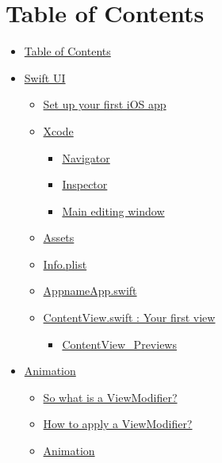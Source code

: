 \documentclass[]{article}
\date{}
\providecommand{\tightlist}{%
  \setlength{\itemsep}{0pt}\setlength{\parskip}{0pt}}
\begin{document}
\hypertarget{table-of-contents}{%
\section{Table of Contents}\label{table-of-contents}}

\begin{itemize}
\tightlist
\item
  \protect\hyperlink{table-of-contents}{Table of Contents}
\item
  \protect\hyperlink{swift-ui}{Swift UI}

  \begin{itemize}
  \tightlist
  \item
    \protect\hyperlink{set-up-your-first-ios-app}{Set up your first iOS
    app}
  \item
    \protect\hyperlink{xcode}{Xcode}

    \begin{itemize}
    \tightlist
    \item
      \protect\hyperlink{navigator}{Navigator}
    \item
      \protect\hyperlink{inspector}{Inspector}
    \item
      \protect\hyperlink{main-editing-window}{Main editing window}
    \end{itemize}
  \item
    \protect\hyperlink{assets}{Assets}
  \item
    \protect\hyperlink{infoplist}{Info.plist}
  \item
    \protect\hyperlink{appnameappswift}{AppnameApp.swift}
  \item
    \protect\hyperlink{contentviewswift--your-first-view}{ContentView.swift
    : Your first view}

    \begin{itemize}
    \tightlist
    \item
      \protect\hyperlink{contentview_previews}{ContentView\_Previews}
    \end{itemize}
  \end{itemize}
\item
  \protect\hyperlink{animation}{Animation}

  \begin{itemize}
  \tightlist
  \item
    \protect\hyperlink{so-what-is-a-viewmodifier}{So what is a
    ViewModifier?}
  \item
    \protect\hyperlink{how-to-apply-a-viewmodifier}{How to apply a
    ViewModifier?}
  \item
    \protect\hyperlink{animation-1}{Animation}


\end{itemize}
\end{itemize}
\end{document}
